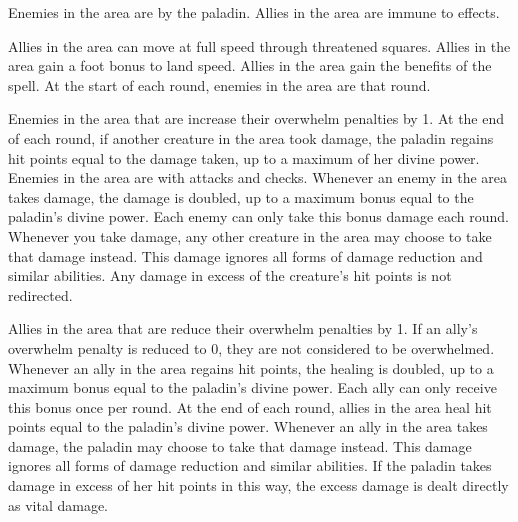         Enemies in the area are \goaded by the paladin.
        Allies in the area are immune to  effects.

        Allies in the area can move at full speed through threatened squares.
        Allies in the area gain a  foot bonus to land speed.
        Allies in the area gain the benefits of the  spell.
        At the start of each round, enemies in the area are \disoriented that round.

        Enemies in the area that are  increase their overwhelm penalties by 1.
        At the end of each round, if another creature in the area took damage, the paladin regains hit points equal to the damage taken, up to a maximum of her divine power.
        Enemies in the area are \impaired with attacks and checks.
        Whenever an enemy in the area takes damage, the damage is doubled, up to a maximum bonus equal to the paladin's divine power.
        Each enemy can only take this bonus damage each round.
        Whenever you take damage, any other creature in the area may choose to take that damage instead.
        This damage ignores all forms of damage reduction and similar abilities.
        Any damage in excess of the creature's hit points is not redirected.

        Allies in the area that are  reduce their overwhelm penalties by 1.
        If an ally's overwhelm penalty is reduced to 0, they are not considered to be overwhelmed.
        Whenever an ally in the area regains hit points, the healing is doubled, up to a maximum bonus equal to the paladin's divine power.
        Each ally can only receive this bonus once per round.
        At the end of each round, allies in the area heal hit points equal to the paladin's divine power.
        Whenever an ally in the area takes damage, the paladin may choose to take that damage instead.
        This damage ignores all forms of damage reduction and similar abilities.
        If the paladin takes damage in excess of her hit points in this way, the excess damage is dealt directly as vital damage.

